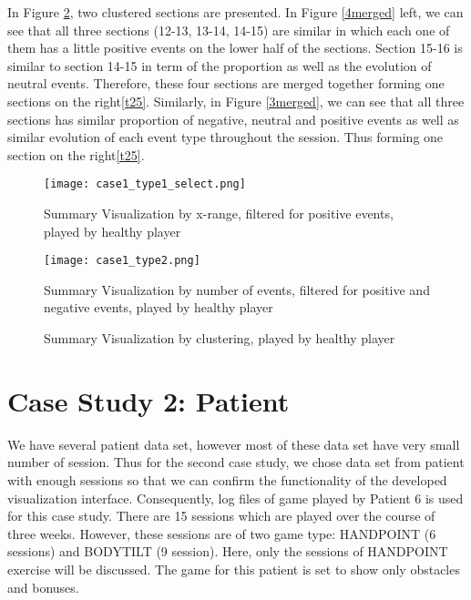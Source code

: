 In Figure \ref{fig:case1_clustered}, two clustered sections are presented. In Figure \ref{4merged} left, we can see that all three sections (12-13, 13-14, 14-15) are similar in which each one of them has a little positive events on the lower half of the sections. Section 15-16 is similar to section 14-15 in term of the proportion as well as the evolution of neutral events. Therefore, these four sections are merged together forming one sections on the right\ref{t25}. Similarly, in Figure \ref{3merged}, we can see that all three sections has similar proportion of negative, neutral and positive events as well as similar evolution of each event type throughout the session. Thus forming one section on the right\ref{t25}.

\setlength{\intextsep}{0.5cm}
\begin{figure}[H]
\centering
\texttt{[image: case1\_type1\_select.png]}
\caption{Summary Visualization by x-range, filtered for positive events, played by healthy player}
\label{fig:case1_type1_select}
\vspace{1cm}
\texttt{[image: case1\_type2.png]}
\caption{Summary Visualization by number of events, filtered for positive and negative events, played by healthy player}
\label{fig:case1_type2}
\end{figure}

\begin{figure}[H]%
    \centering
    \qquad
    \caption{Summary Visualization by clustering, played by healthy player}%
    \label{fig:case1_clustered}%
\end{figure}

\section{Case Study 2: Patient}
We have several patient data set, however most of these data set have very small number of session. Thus for the second case study, we chose data set from patient with enough sessions so that we can confirm the functionality of the developed visualization interface. Consequently, log files of game played by Patient 6 is used for this case study. There are 15 sessions which are played over the course of three weeks. However, these sessions are of two game type: HANDPOINT (6 sessions) and BODYTILT (9 session). Here, only the sessions of HANDPOINT exercise will be discussed. The game for this patient is set to show only obstacles and bonuses.

